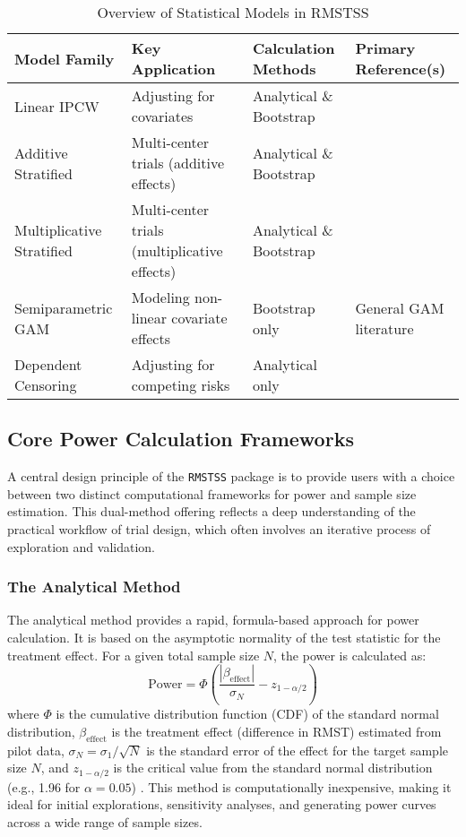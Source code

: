 \documentclass[11pt, a4paper]{article}
\begin{document}
\begin{table}[h!]
\centering
\caption{Overview of Statistical Models in RMSTSS}
\label{tab:model_overview}
\begin{tabular}{@{}llll@{}}
\toprule
\textbf{Model Family} & \textbf{Key Application} & \textbf{Calculation Methods} & \textbf{Primary Reference(s)} \\ \midrule
Linear IPCW & Adjusting for covariates & Analytical \& Bootstrap & \citet{tian2014} \\
Additive Stratified & Multi-center trials (additive effects) & Analytical \& Bootstrap & \citet{zhang2024} \\
Multiplicative Stratified & Multi-center trials (multiplicative effects) & Analytical \& Bootstrap & \citet{wang2019} \\
Semiparametric GAM & Modeling non-linear covariate effects & Bootstrap only & General GAM literature \\
Dependent Censoring & Adjusting for competing risks & Analytical only & \citet{wang2018} \\ \bottomrule
\end{tabular}
\end{table}

\subsection{Core Power Calculation Frameworks}
A central design principle of the \texttt{RMSTSS} package is to provide users with a choice between two distinct computational frameworks for power and sample size estimation. This dual-method offering reflects a deep understanding of the practical workflow of trial design, which often involves an iterative process of exploration and validation.

\subsubsection{The Analytical Method}
The analytical method provides a rapid, formula-based approach for power calculation. It is based on the asymptotic normality of the test statistic for the treatment effect. For a given total sample size $N$, the power is calculated as:
\begin{equation}
\text{Power} = \Phi\left( \frac{|\beta_{\text{effect}}|}{\sigma_N} - z_{1-\alpha/2} \right)
\end{equation}
where $\Phi$ is the cumulative distribution function (CDF) of the standard normal distribution, $\beta_{\text{effect}}$ is the treatment effect (difference in RMST) estimated from pilot data, $\sigma_N = \sigma_1 / \sqrt{N}$ is the standard error of the effect for the target sample size $N$, and $z_{1-\alpha/2}$ is the critical value from the standard normal distribution (e.g., 1.96 for $\alpha=0.05$) \cite{[1]}. This method is computationally inexpensive, making it ideal for initial explorations, sensitivity analyses, and generating power curves across a wide range of sample sizes.
\end{document}
